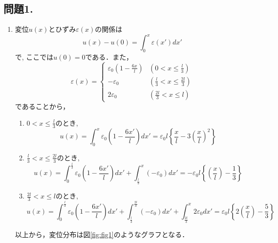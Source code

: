 \documentclass[10pt,a4j]{jarticle}
\begin{document}
\subsection*{問題1.}
\begin{enumerate}
\item
変位$u(x)$とひずみ$\varepsilon(x)$の関係は
\begin{equation}
	u(x)-u(0)=\int_0^x \varepsilon(x')dx'
	\label{eqn:eq1}
\end{equation}
で, ここでは$u(0)=0$である．また，
\begin{equation}
	\varepsilon(x) = \left\{
	\begin{array}{cc}
		\varepsilon_0 \left(1-\frac{6x}{l}\right)& (0<x \leq \frac{l}{3}) \\
		-\varepsilon_0 & \left(\frac{l}{3}< x\leq \frac{2l}{3} \right) \\
		  2\varepsilon_0 & \left(\frac{2l}{3} <x \leq l\right) 
	\end{array}
	\right.
\end{equation}
であることから，
\begin{enumerate}
\item 
$0<x \leq \frac{l}{3}$のとき, 
\begin{equation}
	u(x) = 
	\int_0^x 
		\varepsilon_0 \left(1-\frac{6x'}{l}\right)
	dx '=
	\varepsilon_0 l
	\left\{
		\frac{x}{l}
		-
		3
		\left(\frac{x}{l}\right)^2
	\right\}
	\label{eqn:u1}
\end{equation}
\item
$\frac{l}{3}<x\leq \frac{2l}{3}$のとき, 
\begin{equation}
	u(x) =
		\int_0^{\frac{l}{3}} 
		\varepsilon_0 \left(1-\frac{6x'}{l}\right)
		dx '
		+
		\int_{\frac{l}{3}}^x (-\varepsilon_0 )dx '
		=
		-\varepsilon_0 l
		\left\{ \left(\frac{x}{l}\right)-\frac{1}{3}\right\}
	\label{eqn:u2}
\end{equation}
\item
$\frac{2l}{3}<x\leq l$のとき, 
\begin{equation}
	u(x) =
		\int_0^{\frac{l}{3}} 
		\varepsilon_0 \left(1-\frac{6x'}{l}\right)
		dx '
		+
		\int_{\frac{l}{3}}^{\frac{2l}{3}} (-\varepsilon_0 )dx '
		+
		\int_{\frac{2l}{3}}^x 2\varepsilon_0 dx '
		=
		\varepsilon_0 l
		\left\{ 2\left(\frac{x}{l}\right)-\frac{5}{3}\right\}
	\label{eqn:u3}
\end{equation}
\end{enumerate}
以上から，変位分布は図\ref{fig:fig1}のようなグラフとなる．
%
\begin{figure}[h]
	\begin{center}

\end{center}
\end{figure}
\end{enumerate}
\end{document}
